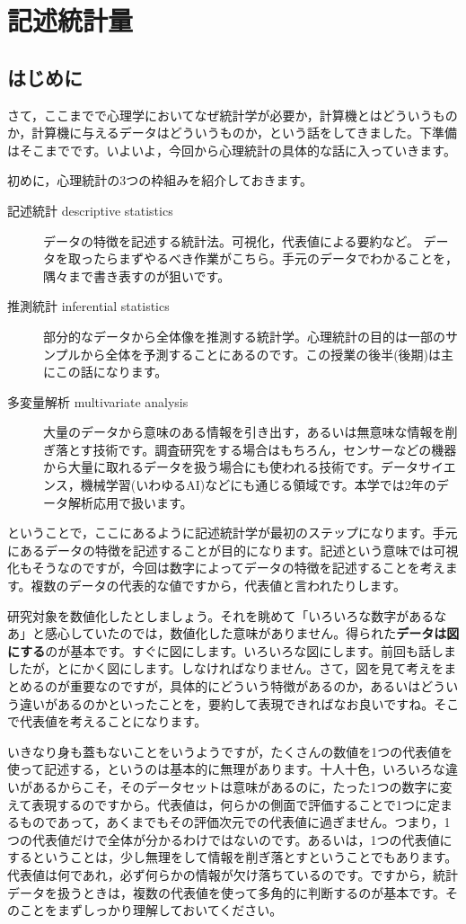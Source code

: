 \documentclass{ltjsbook}
\begin{document}
 
\chapter{記述統計量} 
\label{chapter4} 
\section{はじめに}
さて，ここまでで心理学においてなぜ統計学が必要か，計算機とはどういうものか，計算機に与えるデータはどういうものか，という話をしてきました。下準備はそこまでです。いよいよ，今回から心理統計の具体的な話に入っていきます。

初めに，心理統計の3つの枠組みを紹介しておきます。
\begin{description}
    \item[記述統計 descriptive statistics] データの特徴を記述する統計法。可視化，代表値による要約など。 データを取ったらまずやるべき作業がこちら。手元のデータでわかることを，隅々まで書き表すのが狙いです。
    \item[推測統計 inferential statistics] 部分的なデータから全体像を推測する統計学。心理統計の目的は一部のサンプルから全体を予測することにあるのです。この授業の後半(後期)は主にこの話になります。
    \item[多変量解析 multivariate analysis] 大量のデータから意味のある情報を引き出す，あるいは無意味な情報を削ぎ落とす技術です。調査研究をする場合はもちろん，センサーなどの機器から大量に取れるデータを扱う場合にも使われる技術です。データサイエンス，機械学習(いわゆるAI)などにも通じる領域です。本学では2年のデータ解析応用で扱います。
\end{description}

ということで，ここにあるように記述統計学が最初のステップになります。手元にあるデータの特徴を記述することが目的になります。記述という意味では可視化もそうなのですが，今回は数字によってデータの特徴を記述することを考えます。複数のデータの代表的な値ですから，代表値と言われたりします。

研究対象を数値化したとしましょう。それを眺めて「いろいろな数字があるなあ」と感心していたのでは，数値化した意味がありません。得られた\textbf{データは図にする}のが基本です。すぐに図にします。いろいろな図にします。前回も話しましたが，とにかく図にします。しなければなりません。さて，図を見て考えをまとめるのが重要なのですが，具体的にどういう特徴があるのか，あるいはどういう違いがあるのかといったことを，要約して表現できればなお良いですね。そこで代表値を考えることになります。

いきなり身も蓋もないことをいうようですが，たくさんの数値を1つの代表値を使って記述する，というのは基本的に無理があります。十人十色，いろいろな違いがあるからこそ，そのデータセットは意味があるのに，たった1つの数字に変えて表現するのですから。代表値は，何らかの側面で評価することで1つに定まるものであって，あくまでもその評価次元での代表値に過ぎません。つまり，1つの代表値だけで全体が分かるわけではないのです。あるいは，1つの代表値にするということは，少し無理をして情報を削ぎ落とすということでもあります。代表値は何であれ，必ず何らかの情報が欠け落ちているのです。ですから，統計データを扱うときは，複数の代表値を使って多角的に判断するのが基本です。そのことをまずしっかり理解しておいてください。
\end{document}
